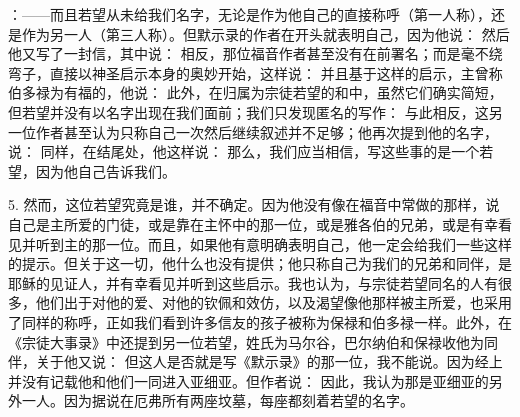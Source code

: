 ：——而且若望从未给我们名字，无论是作为他自己的直接称呼（第一人称），还是作为另一人（第三人称）。但默示录的作者在开头就表明自己，因为他说： 然后他又写了一封信，其中说： 相反，那位福音作者甚至没有在前署名；而是毫不绕弯子，直接以神圣启示本身的奥妙开始，这样说： 并且基于这样的启示，主曾称伯多禄为有福的，他说： 此外，在归属为宗徒若望的和中，虽然它们确实简短，但若望并没有以名字出现在我们面前；我们只发现匿名的写作： 与此相反，这另一位作者甚至认为只称自己一次然后继续叙述并不足够；他再次提到他的名字，说： 同样，在结尾处，他这样说： 那么，我们应当相信，写这些事的是一个若望，因为他自己告诉我们。\par

5. 然而，这位若望究竟是谁，并不确定。因为他没有像在福音中常做的那样，说自己是主所爱的门徒，或是靠在主怀中的那一位，或是雅各伯的兄弟，或是有幸看见并听到主的那一位。而且，如果他有意明确表明自己，他一定会给我们一些这样的提示。但关于这一切，他什么也没有提供；他只称自己为我们的兄弟和同伴，是耶稣的见证人，并有幸看见并听到这些启示。我也认为，与宗徒若望同名的人有很多，他们出于对他的爱、对他的钦佩和效仿，以及渴望像他那样被主所爱，也采用了同样的称呼，正如我们看到许多信友的孩子被称为保禄和伯多禄一样。此外，在《宗徒大事录》中还提到另一位若望，姓氏为马尔谷，巴尔纳伯和保禄收他为同伴，关于他又说： 但这人是否就是写《默示录》的那一位，我不能说。因为经上并没有记载他和他们一同进入亚细亚。但作者说： 因此，我认为那是亚细亚的另外一人。因为据说在厄弗所有两座坟墓，每座都刻着若望的名字。\par

